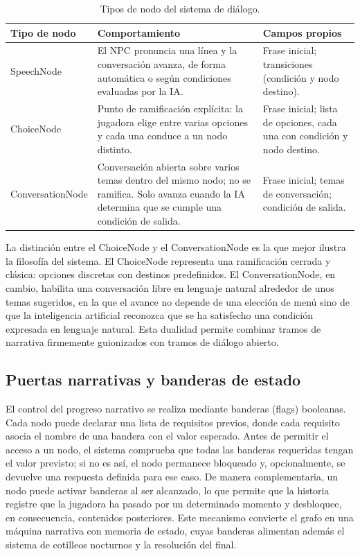 \documentclass[12pt,twoside,titlepage]{report}
\begin{document}
\begin{table}[h]
  \centering
  \caption{Tipos de nodo del sistema de diálogo.}
  \label{tab:tipos_nodo}
  \begin{footnotesize}
  \renewcommand{\arraystretch}{1.3}
  \begin{tabular}{p{2.6cm}p{6cm}p{4.5cm}}
    \hline
    \textbf{Tipo de nodo} & \textbf{Comportamiento} & \textbf{Campos propios} \\
    \hline
    SpeechNode & El NPC pronuncia una línea y la conversación avanza, de forma automática o según condiciones evaluadas por la IA. & Frase inicial; transiciones (condición y nodo destino). \\
    \hline
    ChoiceNode & Punto de ramificación explícita: la jugadora elige entre varias opciones y cada una conduce a un nodo distinto. & Frase inicial; lista de opciones, cada una con condición y nodo destino. \\
    \hline
    ConversationNode & Conversación abierta sobre varios temas dentro del mismo nodo; no se ramifica. Solo avanza cuando la IA determina que se cumple una condición de salida. & Frase inicial; temas de conversación; condición de salida. \\
    \hline
  \end{tabular}
  \end{footnotesize}
\end{table}

La distinción entre el ChoiceNode y el ConversationNode es la que mejor ilustra la filosofía del sistema. El ChoiceNode representa una ramificación cerrada y clásica: opciones discretas con destinos predefinidos. El ConversationNode, en cambio, habilita una conversación libre en lenguaje natural alrededor de unos temas sugeridos, en la que el avance no depende de una elección de menú sino de que la inteligencia artificial reconozca que se ha satisfecho una condición expresada en lenguaje natural. Esta dualidad permite combinar tramos de narrativa firmemente guionizados con tramos de diálogo abierto.

\subsection{Puertas narrativas y banderas de estado}

El control del progreso narrativo se realiza mediante banderas (flags) booleanas. Cada nodo puede declarar una lista de requisitos previos, donde cada requisito asocia el nombre de una bandera con el valor esperado. Antes de permitir el acceso a un nodo, el sistema comprueba que todas las banderas requeridas tengan el valor previsto; si no es así, el nodo permanece bloqueado y, opcionalmente, se devuelve una respuesta definida para ese caso. De manera complementaria, un nodo puede activar banderas al ser alcanzado, lo que permite que la historia registre que la jugadora ha pasado por un determinado momento y desbloquee, en consecuencia, contenidos posteriores. Este mecanismo convierte el grafo en una máquina narrativa con memoria de estado, cuyas banderas alimentan además el sistema de cotilleos nocturnos y la resolución del final.
\end{document}
